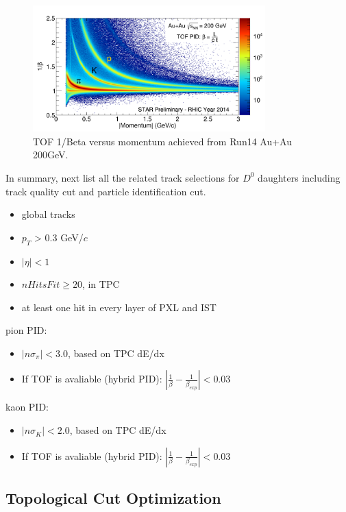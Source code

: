 \documentclass[a4paper]{article}
\begin{document}
\begin{figure}[htbp]
\centering
\includegraphics[keepaspectratio,width=0.8\textwidth]{fig/Run14_AuAu_tofBeta_PR.png}
\caption{TOF 1/Beta versus momentum achieved from Run14 Au+Au 200GeV.}
 \label{fig:tofPID}
\end{figure}

In summary, next list all the related track selections for $D^0$ daughters including track quality cut and particle identification cut.
\begin{itemize}
\item global tracks
\item $p_{T}$ > 0.3 GeV/$c$
\item $|\eta| < 1$
\item $nHitsFit \ge 20$, in TPC
\item at least one hit in every layer of PXL and IST
\end{itemize}

pion PID:
\begin{itemize}
  \item $|n\sigma_{\pi}| < 3.0 $, based on TPC dE/dx
  \item If TOF is avaliable (hybrid PID):  $|\frac{1}{\beta}-\frac{1}{\beta_{exp}}|<0.03$
\end{itemize}

kaon PID:
\begin{itemize}
  \item $|n\sigma_{K}| < 2.0 $, based on TPC dE/dx
  \item If TOF is avaliable (hybrid PID):  $|\frac{1}{\beta}-\frac{1}{\beta_{exp}}|<0.03$
\end{itemize}


\subsection{Topological Cut Optimization}
\end{document}
